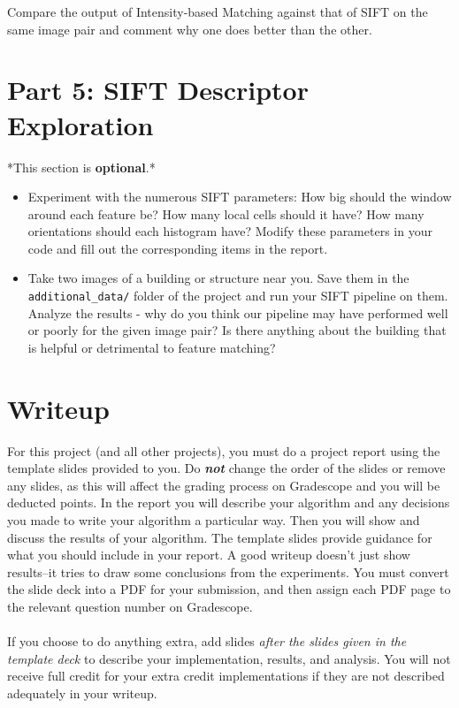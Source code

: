 \documentclass{article}
\begin{document}
Compare the output of Intensity-based Matching against that of SIFT on the same image pair and comment why one does better than the other.  

\section{Part 5: SIFT Descriptor Exploration}
*This section is \textbf{optional}.* 

\begin{itemize}
    \item Experiment with the numerous SIFT parameters: How big should the window around each feature be? How many local cells should it have? How many orientations should each histogram have? Modify these parameters in your code and fill out the corresponding items in the report.
    \item Take two images of a building or structure near you. Save them in the \lstinline{additional_data/} folder of the project and run your SIFT pipeline on them.  Analyze the results - why do you think our pipeline may have performed well or poorly for the given image pair? Is there anything about the building that is helpful or detrimental to feature matching?
\end{itemize}
\section{Writeup}
For this project (and all other projects), you must do a project report using the template slides provided to you. Do \textbf{\textit{not}} change the order of the slides or remove any slides, as this will affect the grading process on Gradescope and you will be deducted points. In the report you will describe your algorithm and any decisions you made to write your algorithm a particular way. Then you will show and discuss the results of your algorithm. The template slides provide guidance for what you should include in your report. A good writeup doesn't just show results--it tries to draw some conclusions from the experiments. You must convert the slide deck into a PDF for your submission, and then assign each PDF page to the relevant question number on Gradescope.
\\
\\
If you choose to do anything extra, add slides \textit{after the slides given in the template deck} to describe your implementation, results, and analysis. You will not receive full credit for your extra credit implementations if they are not described adequately in your writeup.
\end{document}

